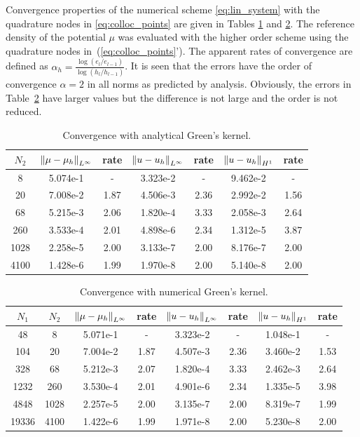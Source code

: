 Convergence properties of the numerical scheme \eqref{eq:lin_system} with the quadrature nodes in \eqref{eq:colloc_points} are given in Tables \ref{tab:IV_Analit_GF_err} and \ref{tab:IV_Num_GF_err}.
The reference density of the potential $\mu$ was evaluated with the higher order scheme using the quadrature nodes in~(\ref{eq:colloc_points}').
The apparent rates of convergence are defined as $\alpha_h = \displaystyle{\frac{\log (e_{l}/e_{l-1})}{\log (h_l/h_{l-1})}}$.
It is seen that the errors have the order of convergence $\alpha=2$ in all norms as predicted by analysis.
Obviously, the errors in Table~\ref{tab:IV_Num_GF_err} have larger values but the difference is not large and the order is not reduced.


\begin{table}[!t]
\centering
\def\arraystretch{1.5}
\begin{tabular}{|c|cc|cc|cc|}
\hline
 $N_2$ & $\left\| \mu-\mu_h \right\|_{L^{\infty}}$ & rate & $\left\| u-u_h \right\|_{L^{\infty}}$ & rate & $\left\| u-u_h \right\|_{H^{1}}$ & rate \\ \hline 
   8 & 5.074e-1 &   -  & 3.323e-2 &   -  &  9.462e-2 &   -  \\ 
  20 & 7.008e-2 & 1.87 & 4.506e-3 & 2.36 &  2.992e-2 & 1.56 \\ 
  68 & 5.215e-3 & 2.06 & 1.820e-4 & 3.33 &  2.058e-3 & 2.64 \\
 260 & 3.533e-4 & 2.01 & 4.898e-6 & 2.34 &  1.312e-5 & 3.87 \\
1028 & 2.258e-5 & 2.00 & 3.133e-7 & 2.00 &  8.176e-7 & 2.00 \\
4100 & 1.428e-6 & 1.99 & 1.970e-8 & 2.00 &  5.140e-8 & 2.00 \\ \hline
\end{tabular}
\caption[ Convergence with analytical Green's kernel ]{ Convergence with analytical Green's kernel. }
\label{tab:IV_Analit_GF_err}
\end{table}

\begin{table}[!t]
\centering
\def\arraystretch{1.5}
\begin{tabular}{|cc|cc|cc|cc|}
\hline
  $N_1$ &  $N_2$ & $\left\| \mu-\mu_h \right\|_{L^{\infty}}$ & rate & $\left\| u-u_h \right\|_{L^{\infty}}$ & rate & $\left\| u-u_h \right\|_{H^{1}}$ & rate \\ \hline 
  48  &    8 & 5.071e-1 &   -  & 3.323e-2 &   -  &  1.048e-1 &   -  \\
 104  &   20 & 7.004e-2 & 1.87 & 4.507e-3 & 2.36 &  3.460e-2 & 1.53 \\
 328  &   68 & 5.212e-3 & 2.07 & 1.820e-4 & 3.33 &  2.462e-3 & 2.64 \\
1232  &  260 & 3.530e-4 & 2.01 & 4.901e-6 & 2.34 &  1.335e-5 & 3.98 \\
4848  & 1028 & 2.257e-5 & 2.00 & 3.135e-7 & 2.00 &  8.319e-7 & 1.99 \\
19336  & 4100 & 1.422e-6 & 1.99 & 1.971e-8 & 2.00 &  5.230e-8 & 2.00 \\ \hline
\end{tabular}
\caption[ Convergence with numerical Green's kernel ]{ Convergence with numerical Green's kernel. }
\label{tab:IV_Num_GF_err}
\end{table}



